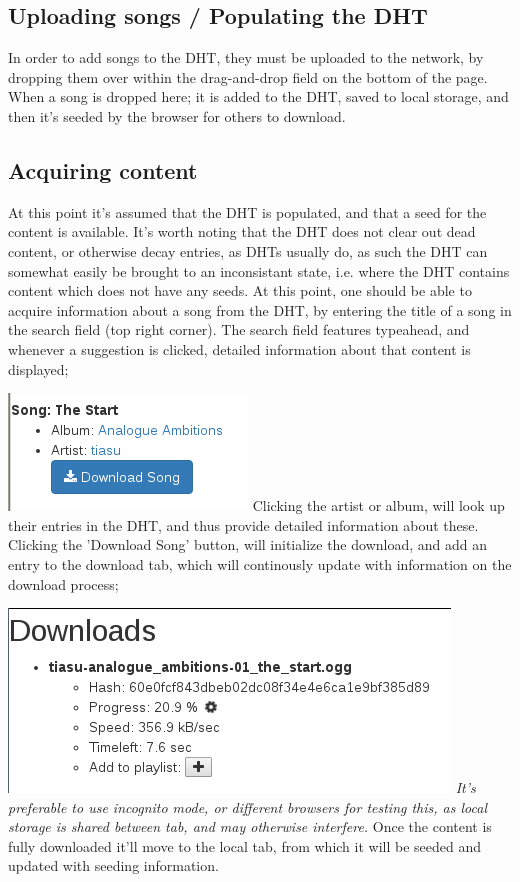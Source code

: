 \subsection{Uploading songs / Populating the DHT}
In order to add songs to the DHT, they must be uploaded to the network, by 
dropping them over within the drag-and-drop field on the bottom of the page.
When a song is dropped here; it is added to the DHT, saved to local storage,
and then it's seeded by the browser for others to download.

\subsection{Acquiring content}
At this point it's assumed that the DHT is populated, and that a seed for the
content is available. It's worth noting that the DHT does not clear out dead
content, or otherwise decay entries, as DHTs usually do, as such the DHT can 
somewhat easily be brought to an inconsistant state, i.e. where the DHT
contains content which does not have any seeds.
\newline\newline
At this point, one should be able to acquire information about a song from the
DHT, by entering the title of a song in the search field (top right corner).
The search field features typeahead, and whenever a suggestion is clicked,
detailed information about that content is displayed;

\includegraphics{gfx/search-info}
\newline
Clicking the artist or album, will look up their entries in the DHT, and thus
provide detailed information about these. Clicking the 'Download Song' button,
will initialize the download, and add an entry to the download tab, which will
continously update with information on the download process;

\includegraphics{gfx/download-info}
\newline
{\em It's preferable to use incognito mode, or different browsers for testing this,
as local storage is shared between tab, and may otherwise interfere.}
\newline\newline
Once the content is fully downloaded it'll move to the local tab, from which it
will be seeded and updated with seeding information. 

